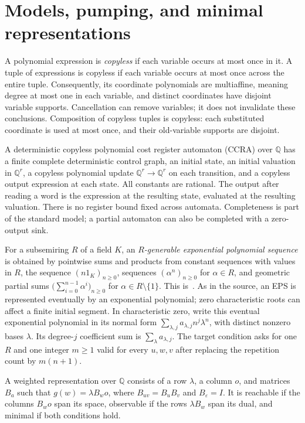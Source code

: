 \documentclass[acmlarge,screen,11pt,nonacm]{acmart}
\newcommand{\Q}{\mathbb{Q}}
\newcommand{\eps}{\varepsilon}
\theoremstyle{definition}
\begin{document}
\section{Models, pumping, and minimal representations}\label{sec:prelim}
A polynomial expression is \emph{copyless} if each variable occurs at most once in it. A tuple of expressions is copyless if each variable occurs at most once across the entire tuple. Consequently, its coordinate polynomials are multiaffine, meaning degree at most one in each variable, and distinct coordinates have disjoint variable supports. Cancellation can remove variables; it does not invalidate these conclusions. Composition of copyless tuples is copyless: each substituted coordinate is used at most once, and their old-variable supports are disjoint.

A deterministic copyless polynomial cost register automaton (CCRA) over $\Q$ has a finite complete deterministic control graph, an initial state, an initial valuation in $\Q^r$, a copyless polynomial update $\Q^r\to\Q^r$ on each transition, and a copyless output expression at each state. All constants are rational. The output after reading a word is the expression at the resulting state, evaluated at the resulting valuation. There is no register bound fixed across automata. Completeness is part of the standard model; a partial automaton can also be completed with a zero-output sink.

For a subsemiring $R$ of a field $K$, an \emph{$R$-generable exponential polynomial sequence} is obtained by pointwise sums and products from constant sequences with values in $R$, the sequence $(n1_K)_{n\geq0}$, sequences $(\alpha^n)_{n\geq0}$ for $\alpha\in R$, and geometric partial sums $\bigl(\sum_{i=0}^{n-1}\alpha^i\bigr)_{n\geq0}$ for $\alpha\in R\setminus\{1\}$. This is~\cite[Definition~11]{MPS26}. As in the source, an EPS is represented eventually by an exponential polynomial; zero characteristic roots can affect a finite initial segment. In characteristic zero, write this eventual exponential polynomial in its normal form $\sum_{\lambda,j}a_{\lambda,j}n^j\lambda^n$, with distinct nonzero bases $\lambda$. Its degree-$j$ coefficient sum is $\sum_\lambda a_{\lambda,j}$. The target condition asks for one $R$ and one integer $m\geq1$ valid for every $u,w,v$ after replacing the repetition count by $m(n+1)$.

A weighted representation over $\Q$ consists of a row $\lambda$, a column $o$, and matrices $B_a$ such that $g(w)=\lambda B_w o$, where $B_{uv}=B_uB_v$ and $B_\eps=I$. It is reachable if the columns $B_w o$ span its space, observable if the rows $\lambda B_w$ span its dual, and minimal if both conditions hold.
\end{document}
